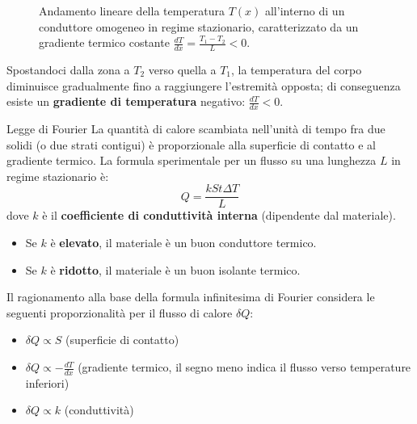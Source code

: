 \begin{figure}[ht]
\centering
{}
\caption{Andamento lineare della temperatura $T(x)$ all'interno di un conduttore omogeneo in regime stazionario, caratterizzato da un gradiente termico costante $\frac{dT}{dx} = \frac{T_1-T_2}{L} < 0$.}
\end{figure}

Spostandoci dalla zona a $T_2$ verso quella a $T_1$, la temperatura del corpo diminuisce gradualmente fino a raggiungere l'estremità opposta; di conseguenza esiste un \textbf{gradiente di temperatura} negativo: $\frac{dT}{dx} < 0$.

\begin{teorema}{Legge di Fourier}
La quantità di calore scambiata nell'unità di tempo fra due solidi (o due strati contigui) è proporzionale alla superficie di contatto e al gradiente termico. La formula sperimentale per un flusso su una lunghezza $L$ in regime stazionario è:
\begin{equation}
\boxed{Q = \frac{k S t \Delta T}{L}}
\end{equation}
dove $k$ è il \textbf{coefficiente di conduttività interna} (dipendente dal materiale).
\begin{itemize}
    \item Se $k$ è \textbf{elevato}, il materiale è un buon conduttore termico.
    \item Se $k$ è \textbf{ridotto}, il materiale è un buon isolante termico.
\end{itemize}
\end{teorema}

\medskip
Il ragionamento alla base della formula infinitesima di Fourier considera le seguenti proporzionalità per il flusso di calore $\delta Q$:
\begin{itemize}
    \item $\delta Q \propto S$ (superficie di contatto)
    \item $\delta Q \propto -\frac{dT}{dx}$ (gradiente termico, il segno meno indica il flusso verso temperature inferiori)
    \item $\delta Q \propto k$ (conduttività)
\end{itemize}

